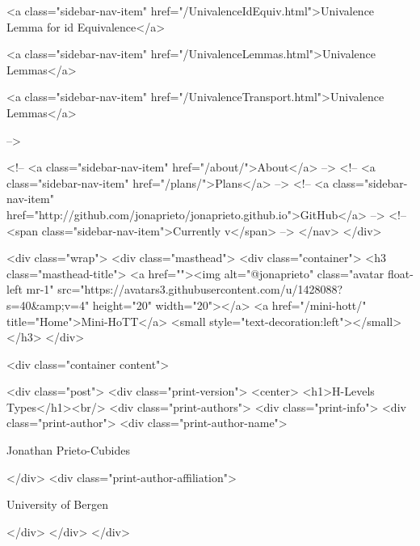       
    
      
        
          <a class="sidebar-nav-item" href="/UnivalenceIdEquiv.html">Univalence Lemma for id Equivalence</a>
        
      
    
      
        
          <a class="sidebar-nav-item" href="/UnivalenceLemmas.html">Univalence Lemmas</a>
        
      
    
      
        
          <a class="sidebar-nav-item" href="/UnivalenceTransport.html">Univalence Lemmas</a>
        
      
     -->

    <!-- <a class="sidebar-nav-item" href="/about/">About</a> -->
    <!-- <a class="sidebar-nav-item" href="/plans/">Plans</a> -->
    <!-- <a class="sidebar-nav-item" href="http://github.com/jonaprieto/jonaprieto.github.io">GitHub</a> -->
    <!-- <span class="sidebar-nav-item">Currently v</span> -->
  </nav>
</div>

    <div class="wrap">
      <div class="masthead">
        <div class="container">
          <h3 class="masthead-title">
            <a href=""><img alt="@jonaprieto" class="avatar float-left mr-1" src="https://avatars3.githubusercontent.com/u/1428088?s=40&amp;v=4" height="20" width="20"></a>
            <a href="/mini-hott/" title="Home">Mini-HoTT</a>
            <small style="text-decoration:left"></small>
          </h3>
        </div>
      
      <div class="container content">
        







<div class="post">
  <div class="print-version">
    <center>
      <h1>H-Levels Types</h1><br/>
        <div class="print-authors">
          <div class="print-info">
            <div class="print-author">
              <div class="print-author-name">
                
                  Jonathan Prieto-Cubides
                
              </div>
              <div class="print-author-affiliation">
                
                  University of Bergen
                
                </div>
            </div>
          </div>
          
